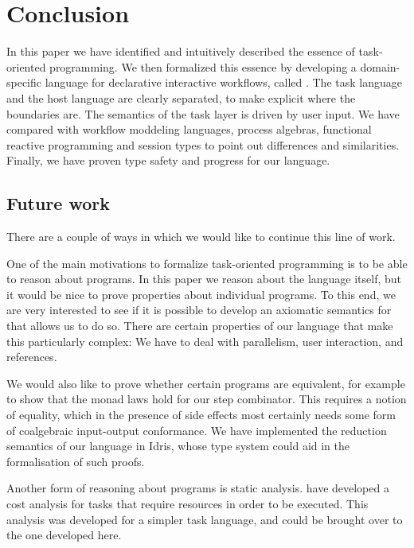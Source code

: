
\section{Conclusion}

\label{sec:conclusions}

In this paper we have identified and intuitively described the essence of task-oriented programming.
We then formalized this essence by developing a domain-specific language for declarative interactive workflows, called \TOPHAT.
The task language and the host language are clearly separated, to make explicit where the boundaries are.
The semantics of the task layer is driven by user input.
We have compared \TOPHAT with workflow moddeling languages, process algebras, functional reactive programming and session types to point out differences and similarities.
Finally, we have proven type safety and progress for our language.

\subsection{Future work}

There are a couple of ways in which we would like to continue this line of work.

One of the main motivations to formalize task-oriented programming is to be able to reason about programs.
In this paper we reason about the language itself, but it would be nice to prove properties about individual programs.
To this end, we are very interested to see if it is possible to develop an axiomatic semantics for \TOPHAT that allows us to do so.
There are certain properties of our language that make this particularly complex:
We have to deal with parallelism, user interaction, and references.

We would also like to prove whether certain programs are equivalent, for example to show that the monad laws hold for our step combinator.
This requires a notion of equality, which in the presence of side effects most certainly needs some form of coalgebraic input-output conformance.
We have implemented the reduction semantics of our language in Idris, whose type system could aid in the formalisation of such proofs.

Another form of reasoning about programs is static analysis.
\citet{conf/ifl/KlinikJP17} have developed a cost analysis for tasks that require resources in order to be executed.
This analysis was developed for a simpler task language, and could be brought over to the one developed here.

